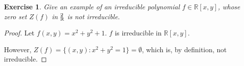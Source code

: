 \documentclass[12pt,letterpaper]{article}
\newtheorem{problem}{Exercise}[section]
\theoremstyle{definition}
\theoremstyle{remark}
\numberwithin{equation}{section}
\numberwithin{figure}{problem}
\let\AA\relax
\DeclareMathOperator{\AA}{\mathbb{A}}
\begin{document}
\begin{problem} Give an example of an irreducible polynomial $f \in \mathbb{R}[x,y]$, whose zero set $Z(f)$ in $\AA_{\mathbb{R}}^2$ is not irreducible.
\end{problem}

\begin{proof}
Let $f(x,y) = x^2 + y^2 +1$. $f$ is irreducible in $\mathbb{R}[x,y]$. 

However, $Z(f) = \{(x,y): x^2 +y^2 = 1\} =\emptyset$, which is, by definition, not irreducible.  

\end{proof}

\printbibliography
\end{document}
